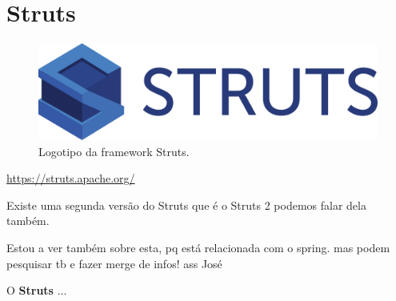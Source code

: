 \section{Struts}
\label{subsec:struts}

\begin{figure}[H]
    \centering
    \includegraphics[scale=0.25]{images/struts.png}
    \caption{Logotipo da framework Struts.}
    \label{fig:struts}
\end{figure}

\href{https://struts.apache.org/}{https://struts.apache.org/}

Existe uma segunda versão do Struts que é o Struts 2 podemos falar dela também.

Estou a ver também sobre esta, pq está relacionada com o spring. mas podem pesquisar tb e fazer merge de infos! ass José

\hspace{5mm} O \textbf{Struts} ...